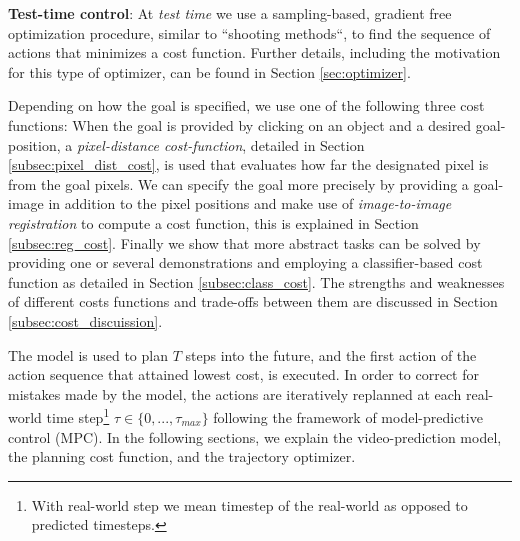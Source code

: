\textbf{Test-time control}: At \emph{test time} we use a sampling-based, gradient free optimization procedure, similar to ``shooting methods``, to find the sequence of actions that minimizes a cost function. Further details, including the motivation for this type of optimizer, can be found in Section \ref{sec:optimizer}. 

Depending on how the goal is specified, we use one of the following three cost functions: When the goal is provided by clicking on an object and a desired goal-position, a \emph{pixel-distance cost-function}, detailed in Section \ref{subsec:pixel_dist_cost}, is used that evaluates how far the designated pixel is from the goal pixels. We can specify the goal more precisely by providing a goal-image in addition to the pixel positions and make use of \emph{image-to-image registration} to compute a cost function, this is explained in Section \ref{subsec:reg_cost}. Finally we show that more abstract tasks can be solved by providing one or several demonstrations and employing a classifier-based cost function as detailed in Section \ref{subsec:class_cost}. The strengths and weaknesses of different costs functions and trade-offs between them are discussed in Section \ref{subsec:cost_discuission}. 

The model is used to plan $T$ steps into the future, and the first action of the action sequence that attained lowest cost, is executed. In order to correct for mistakes made by the model, the actions are iteratively replanned at each real-world time step\footnote{With real-world step we mean timestep of the real-world as opposed to predicted timesteps.} $\tau \in \{0,...,\tau_{max}\}$ following the framework of model-predictive control (MPC). 
In the following sections, we explain the video-prediction model, the planning cost function, and the trajectory optimizer.









